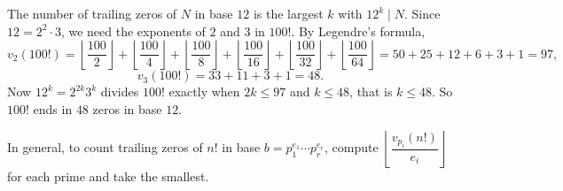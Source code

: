 The number of trailing zeros of $N$ in base $12$ is the largest $k$ with $12^k\mid N$. Since $12=2^2\cdot3$, we need the exponents of $2$ and $3$ in $100!$. By Legendre's formula,
\[
v_2(100!)=\left\lfloor\dfrac{100}{2}\right\rfloor+\left\lfloor\dfrac{100}{4}\right\rfloor+\left\lfloor\dfrac{100}{8}\right\rfloor+\left\lfloor\dfrac{100}{16}\right\rfloor+\left\lfloor\dfrac{100}{32}\right\rfloor+\left\lfloor\dfrac{100}{64}\right\rfloor=50+25+12+6+3+1=97,
\]
\[
v_3(100!)=33+11+3+1=48 .
\]
Now $12^k=2^{2k}3^k$ divides $100!$ exactly when $2k\le97$ and $k\le48$, that is $k\le48$. So $100!$ ends in $\boxed{48}$ zeros in base $12$.

In general, to count trailing zeros of $n!$ in base $b=p_1^{e_1}\cdots p_r^{e_r}$, compute $\left\lfloor\dfrac{v_{p_i}(n!)}{e_i}\right\rfloor$ for each prime and take the smallest.
